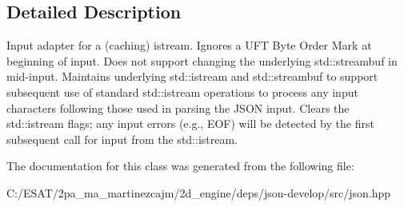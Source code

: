 \subsection{Detailed Description}
Input adapter for a (caching) istream. Ignores a U\+FT Byte Order Mark at beginning of input. Does not support changing the underlying std\+::streambuf in mid-\/input. Maintains underlying std\+::istream and std\+::streambuf to support subsequent use of standard std\+::istream operations to process any input characters following those used in parsing the J\+S\+ON input. Clears the std\+::istream flags; any input errors (e.\+g., E\+OF) will be detected by the first subsequent call for input from the std\+::istream. 

The documentation for this class was generated from the following file\+:\begin{DoxyCompactItemize}
\item 
C\+:/\+E\+S\+A\+T/2pa\+\_\+ma\+\_\+martinezcajm/2d\+\_\+engine/deps/json-\/develop/src/json.\+hpp\end{DoxyCompactItemize}
